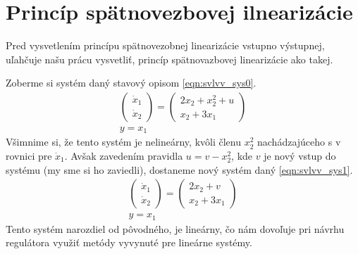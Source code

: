 


    \section{Princíp spätnovezbovej ilnearizácie}
    Pred vysvetlením princípu spätnovezobnej linearizácie vstupno výstupnej, uľahčuje našu prácu vysvetliť, princíp spätnovazbovej linearizácie ako takej.

    Zoberme si systém daný stavový opisom \cref{eqn:svlvv_sys0}.
    \begin{equation}
        \begin{gathered}
        \begin{pmatrix} 
            \dot{x}_1 \\ 
            \dot{x}_2
        \end{pmatrix} = \begin{pmatrix}
            2x_2 + x_2^2 + u \\
            x_2 + 3x_1
        \end{pmatrix}\\
        y = x_1
        \end{gathered}
        \label{eqn:svlvv_sys0}
    \end{equation}
    Všimnime si, že tento systém je nelineárny, kvôli členu $x_2^2$ nachádzajúceho s v rovnici pre $\dot{x}_1$. Avšak zavedením pravidla $u = v - x_2^2$, kde $v$ je nový vstup do systému (my sme si ho zaviedli), dostaneme nový systém daný \cref{eqn:svlvv_sys1}.
    \begin{equation}
        \begin{gathered}
        \begin{pmatrix} 
            \dot{x}_1 \\ 
            \dot{x}_2
        \end{pmatrix} = \begin{pmatrix}
            2x_2 + v \\
            x_2 + 3x_1
        \end{pmatrix}\\
        y = x_1
        \end{gathered}
        \label{eqn:svlvv_sys1}
    \end{equation}
    Tento systém narozdiel od pôvodného, je lineárny, čo nám dovoľuje pri návrhu regulátora využiť metódy vyvynuté pre lineárne systémy.


